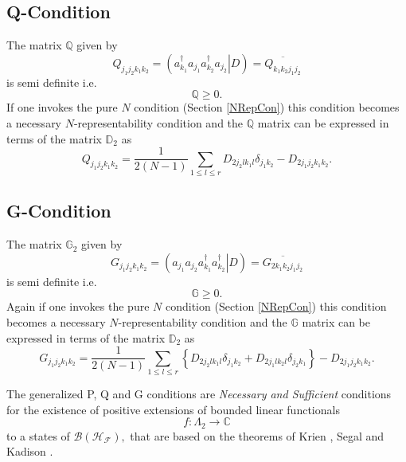 \documentclass[aps,preprint]{revtex4}%
\begin{document}
\subsection{Q-Condition}

The matrix $\mathbb{Q}$ given by
\begin{equation}
Q_{j_{1}j_{2}k_{1}k_{2}}=\left(  \left.  a_{k_{1}}^{\dagger}a_{j_{1}}a_{k_{2}%
}^{\dagger}a_{j_{2}}\right\vert D\right)  =\overline{Q_{k_{1}k_{2}j_{1}j_{2}}}%
\end{equation}
is semi definite i.e.
\begin{equation}
\mathbb{Q}\geq0.
\end{equation}
If one invokes the pure $N$ condition (Section \ref{NRepCon}) this condition
becomes a necessary $N$-representability condition and the $\mathbb{Q}$ matrix
can be expressed in terms of the matrix $\mathbb{D}_{2}$ as
\begin{equation}
Q_{j_{1}j_{2}k_{1}k_{2}}=\frac{1}{2\left(  N-1\right)  }\sum_{1\leq l\leq
r}D_{2j_{2}lk_{1}l}\delta_{j_{1}k_{2}}-D_{2j_{1}j_{2}k_{1}k_{2}}.
\end{equation}


\subsection{G-Condition}

The matrix $\mathbb{G}_{2}$ given by
\begin{equation}
G_{j_{1}j_{2}k_{1}k_{2}}=\left(  \left.  a_{j_{1}}a_{j_{2}}a_{k_{1}}^{\dagger
}a_{k_{2}}^{\dagger}\right\vert D\right)  =\overline{G_{2k_{1}k_{2}j_{1}j_{2}%
}}%
\end{equation}
is semi definite i.e.
\begin{equation}
\mathbb{G}\geq0.
\end{equation}
Again if one invokes the pure $N$ condition (Section \ref{NRepCon}) this
condition becomes a necessary $N$-representability condition and the
$\mathbb{G}$ matrix can be expressed in terms of the matrix $\mathbb{D}_{2}$
as
\begin{equation}
G_{j_{1}j_{2}k_{1}k_{2}}=\frac{1}{2\left(  N-1\right)  }\sum_{1\leq l\leq
r}\left\{  D_{2j_{2}lk_{1}l}\delta_{j_{1}k_{2}}+D_{2j_{1}lk_{2}l}\delta
_{j_{2}k_{1}}\right\}  -D_{2j_{1}j_{2}k_{1}k_{2}}.
\end{equation}


The generalized P, Q and G conditions are \emph{Necessary and Sufficient
}conditions for the existence of positive extensions of bounded linear
functionals
\begin{equation}
f:\Lambda_{2}\rightarrow\mathbb{C}%
\end{equation}
to a states of $\mathcal{B}\left(  \mathcal{H}_{\mathcal{F}}\right)  ,$ that
are based on the theorems of Krien \cite{Krein}, Segal \cite{Segal} and
Kadison \cite{Kadison}.
\end{document}
